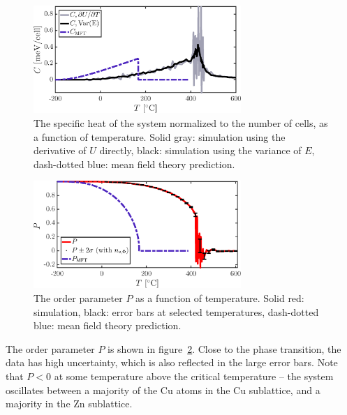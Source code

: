 \begin{figure}[!ht]
\begin{center}
  \includegraphics[width=0.7\textwidth]{../figures/C} 
  \caption{The specific heat of the system normalized to the number of cells, as a function of temperature. Solid gray: simulation using the derivative of $U$ directly, black: simulation using the variance of $E$, dash-dotted blue: mean field theory prediction.}
  \label{fig:C}
\end{center}
\end{figure}

\begin{figure}[!ht]
\begin{center}
  \includegraphics[width=0.7\textwidth]{../figures/P} 
  \caption{The order parameter $P$ as a function of temperature. Solid red: simulation, black: error bars at selected temperatures, dash-dotted blue: mean field theory prediction.}
  \label{fig:P}
\end{center}
\end{figure}

The order parameter $P$ is shown in figure~\ref{fig:P}. Close to the phase transition, the data has high uncertainty, which is also reflected in the large error bars. Note that $P <0$ at some temperature above the critical temperature -- the system oscillates between a majority of the Cu atoms in the Cu sublattice, and a majority in the Zn sublattice.  

